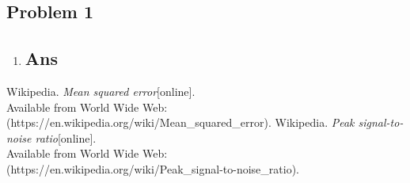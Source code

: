 	\begin{reportsection}{-1cm}{-1cm}
		\section*{Problem 1}
		\begin{enumerate}[label=\alph*.]
			\item 
			      \blindtext[1]
			      \subsection*{Ans}
			      \blindtext[1]
		\end{enumerate}
		
		\begin{thebibliography}{9}
			 Wikipedia. \emph{Mean squared error}[online]. \\
			Available from World Wide Web: (https://en.wikipedia.org/wiki/Mean\_squared\_error).
			 Wikipedia. \emph{Peak signal-to-noise ratio}[online].\\
			Available from World Wide Web: \\
			(https://en.wikipedia.org/wiki/Peak\_signal-to-noise\_ratio).
		\end{thebibliography}
		
	\end{reportsection}
	

